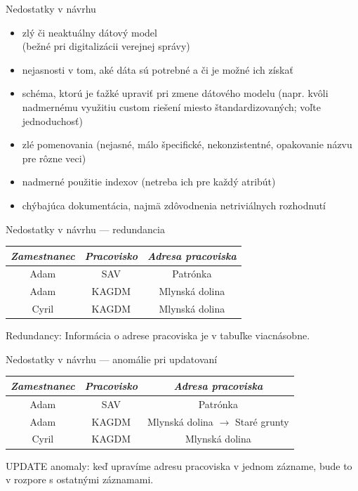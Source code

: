 \documentclass[12pt]{beamer}
\begin{document}
\begin{frame}[fragile]{Nedostatky v návrhu}
\begin{itemize}
\item zlý či neaktuálny dátový model\\ (bežné pri digitalizácii verejnej správy)
\item nejasnosti v tom, aké dáta sú potrebné a či je možné ich získať
\item schéma, ktorú je ťažké upraviť pri zmene dátového modelu
      (napr. kvôli nadmernému využitiu custom riešení miesto štandardizovaných; voľte jednoduchosť)
\item zlé pomenovania (nejasné, málo špecifické, nekonzistentné, opakovanie názvu pre rôzne veci)
\item nadmerné použitie indexov (netreba ich  pre každý atribút)
\item chýbajúca dokumentácia, najmä zdôvodnenia netriviálnych rozhodnutí
\end{itemize}
\end{frame}

\begin{frame}[fragile]{Nedostatky v návrhu --- redundancia}
\begin{tabular}{|c|c|c|}
\hline
\emph{Zamestnanec} & \emph{Pracovisko} & \emph{Adresa pracoviska} \\\hline
Adam & SAV & Patrónka \\\hline
Adam & KAGDM & Mlynská dolina \\\hline
Cyril & KAGDM & Mlynská dolina \\\hline
\end{tabular}
\bigskip

\alert{Redundancy}: Informácia o adrese pracoviska je v tabuľke viacnásobne.
\end{frame}

\begin{frame}[fragile]{Nedostatky v návrhu --- anomálie pri updatovaní}
\begin{tabular}{|c|c|c|}
\hline
\emph{Zamestnanec} & \emph{Pracovisko} & \emph{Adresa pracoviska} \\\hline
Adam & SAV & Patrónka \\\hline
Adam & KAGDM & Mlynská dolina \alert{$\rightarrow$ Staré grunty}\\\hline
Cyril & KAGDM & Mlynská dolina \\\hline
\end{tabular}
\bigskip

\alert{UPDATE anomaly}: keď upravíme adresu pracoviska v jednom zázname, bude to v rozpore s ostatnými záznamami.
\end{frame}
\end{document}
